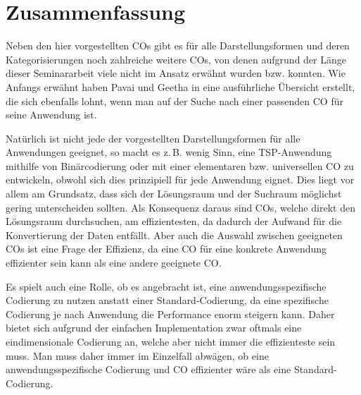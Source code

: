 \documentclass{llncs}
\newcommand{\zB}{z.\,B. }
\begin{document}
	
	
	\section{Zusammenfassung}
	\label{sec:ZusFass}
	
	Neben den hier vorgestellten COs gibt es für alle Darstellungsformen und deren Kategorisierungen noch zahlreiche weitere COs, von denen aufgrund der Länge dieser Seminararbeit viele nicht im Ansatz erwähnt wurden bzw. konnten. Wie Anfangs erwähnt haben Pavai und Geetha in \cite{Survey} eine ausführliche Übersicht erstellt, die sich ebenfalls lohnt, wenn man auf der Suche nach einer passenden CO für seine Anwendung ist.
	
	Natürlich ist nicht jede der vorgestellten Darstellungsformen für alle Anwendungen geeignet, so macht es \zB wenig Sinn, eine TSP-Anwendung mithilfe von Binärcodierung oder mit einer elementaren bzw. universellen CO zu entwickeln, obwohl sich dies prinzipiell für jede Anwendung eignet. Dies liegt vor allem am Grundsatz, dass sich der Lösungsraum und der Suchraum möglichst gering unterscheiden sollten. \cite{TacklingRealCodedGA} Als Konsequenz daraus sind COs, welche direkt den Lösungsraum durchsuchen, am effizientesten, da dadurch der Aufwand für die Konvertierung der Daten entfällt. Aber auch die Auswahl zwischen geeigneten COs ist eine Frage der Effizienz, da eine CO für eine konkrete Anwendung effizienter sein kann als eine andere geeignete CO.
	
	Es spielt auch eine Rolle, ob es angebracht ist, eine anwendungsspezifische Codierung zu nutzen anstatt einer Standard-Codierung, da eine spezifische Codierung je nach Anwendung die Performance enorm steigern kann. Daher bietet sich aufgrund der einfachen Implementation zwar oftmals eine eindimensionale Codierung an, welche aber nicht immer die effizienteste sein muss. Man muss daher immer im Einzelfall abwägen, ob eine anwendungsspezifische Codierung und CO effizienter wäre als eine Standard-Codierung.
	
	\pagebreak
	
	 
	
	
\end{document}
